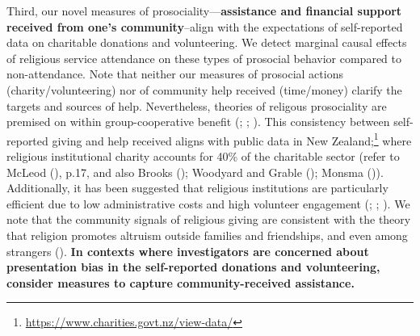 \documentclass[
  single column]{article}
\begin{document}
Third, our novel measures of prosociality---\textbf{assistance and
financial support received from one's community}--align with the
expectations of self-reported data on charitable donations and
volunteering. We detect marginal causal effects of religious service
attendance on these types of prosocial behavior compared to
non-attendance. Note that neither our measures of prosocial actions
(charity/volunteering) nor of community help received (time/money)
clarify the targets and sources of help. Nevertheless, theories of
religous prosociality are premised on within group-cooperative benefit
(;
;
). This
consistency between self-reported giving and help received aligns with
public data in New Zealand;\footnote{\url{https://www.charities.govt.nz/view-data/}}
where religious institutional charity accounts for 40\% of the
charitable sector (refer to McLeod (),
p.17, and also Brooks (); Woodyard
and Grable (); Monsma
()). Additionally, it has been
suggested that religious institutions are particularly efficient due to
low administrative costs and high volunteer engagement
(;
;
). We note that the
community signals of religious giving are consistent with the theory
that religion promotes altruism outside families and friendships, and
even among strangers (). \textbf{In contexts where investigators are concerned about
presentation bias in the self-reported donations and volunteering,
consider measures to capture community-received assistance.}
\end{document}
